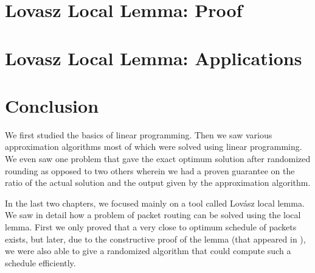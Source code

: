 \documentclass[a4paper,10pt]{report}
\begin{document}
\chapter{Lovasz Local Lemma: Proof}

\chapter{Lovasz Local Lemma: Applications}

\chapter{Conclusion}
We first studied the basics of linear programming. Then we saw various approximation algorithms most of which were solved using linear programming. We even saw one problem that gave the exact optimum solution after randomized rounding as opposed to two others wherein we had a proven guarantee on the ratio of the actual solution and the output given by the approximation algorithm. 

In the last two chapters, we focused mainly on a tool called Lov\'asz local lemma. We saw in detail how a problem of packet routing can be solved using the local lemma. First we only proved that a very close to optimum schedule of packets exists, but later, due to the constructive proof of the lemma (that appeared in \cite{constructive}), we were also able to give a randomized algorithm that could compute such a schedule efficiently.
 

\end{document}
